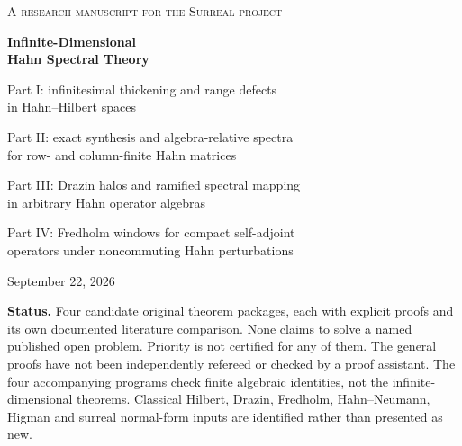 \documentclass[11pt,a4paper]{article}
\numberwithin{equation}{section}
\theoremstyle{definition}
\theoremstyle{remark}
\newcommand{\C}{\mathbb C}
\newcommand{\K}{K}
\begin{document}
\hypersetup{pageanchor=false}
\begin{titlepage}
\centering
\vspace*{12mm}
{\large\scshape A research manuscript for the Surreal project\par}
\vspace{10mm}
{\Huge\bfseries\color{Ink} Infinite-Dimensional\\[.15em] Hahn Spectral Theory\par}
\vspace{10mm}
{\Large Part I: infinitesimal thickening and range defects\\[.1em]
 in Hahn--Hilbert spaces\par}
\vspace{4mm}
{\Large Part II: exact synthesis and algebra-relative spectra\\[.1em]
 for row- and column-finite Hahn matrices\par}
\vspace{4mm}
{\Large Part III: Drazin halos and ramified spectral mapping\\[.1em]
 in arbitrary Hahn operator algebras\par}
\vspace{4mm}
{\Large Part IV: Fredholm windows for compact self-adjoint\\[.1em]
 operators under noncommuting Hahn perturbations\par}
\vspace{10mm}
{\large September 22, 2026\par}
\vfill
\begin{minipage}{.97\textwidth}\small
\textbf{Status.} Four candidate original theorem packages, each with
explicit proofs and its own documented literature comparison. None claims to
solve a named published open problem. Priority is not certified for any of
them. The general proofs have not been independently refereed or checked by
a proof assistant. The four accompanying programs check finite algebraic
identities, not the infinite-dimensional theorems. Classical Hilbert,
Drazin, Fredholm, Hahn--Neumann, Higman and surreal normal-form inputs are
identified rather than presented as new.
\end{minipage}
\newpage
\thispagestyle{empty}
\begin{minipage}{.97\textwidth}\small
\begin{abstract}
\noindent
This report assembles four infinite-dimensional spectral theories over one
Hahn scalar field $\K=\C((t^\Gamma))$. They are printed together because
they continue the same non-claim of the collection's finite-dimensional
spectral report, and they are printed as separate parts because the word
\emph{spectrum} does not mean the same thing in them: the vector spaces and
operator algebras are different. Parts I--III allow arbitrary nonzero
set-sized ordered value groups; Part IV's spectral classification assumes
$\Gamma$ divisible.


\end{abstract}
\end{minipage}
\end{titlepage}
\end{document}

